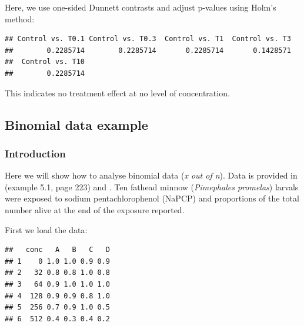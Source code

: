 Here, we use one-sided Dunnett contrasts and adjust p-values using Holm's method:
\begin{knitrout}
\color{fgcolor}\small\begin{kframe}
\begin{alltt}
\hlstd{(} \hlopt{$}  \hlopt{$}
                     \hlstd{=} \hlstd{,}  \hlstd{=} \hlstd{,}  \hlstd{=} \hlstd{)}
\end{alltt}
\begin{verbatim}
## Control vs. T0.1 Control vs. T0.3  Control vs. T1  Control vs. T3 
##        0.2285714        0.2285714       0.2285714       0.1428571 
##  Control vs. T10 
##        0.2285714
\end{verbatim}
\end{kframe}
\end{knitrout}
This indicates no treatment effect at no level of concentration.




\subsection{Binomial data example}
\subsubsection{Introduction}
Here we will show how to analyse binomial data (\emph{x out of n}). 
Data is provided in \citet{newman_quantitative_2012} (example 5.1, page 223) and \citet{epa_methods_2002}.
Ten fathead minnow (\textit{Pimephales promelas}) larvals were exposed to sodium pentachlorophenol (NaPCP) and proportions of the total number alive at the end of the exposure reported.

First we load the data:
\begin{knitrout}
\color{fgcolor}\small\begin{kframe}
\begin{alltt}
 \hlkwb{<-} \hlstd{(} \hlstd{=} \hlstd{,}  \hlstd{=} \hlstd{)}
\end{alltt}
\begin{verbatim}
##   conc   A   B   C   D
## 1    0 1.0 1.0 0.9 0.9
## 2   32 0.8 0.8 1.0 0.8
## 3   64 0.9 1.0 1.0 1.0
## 4  128 0.9 0.9 0.8 1.0
## 5  256 0.7 0.9 1.0 0.5
## 6  512 0.4 0.3 0.4 0.2
\end{verbatim}
\end{kframe}
\end{knitrout}


